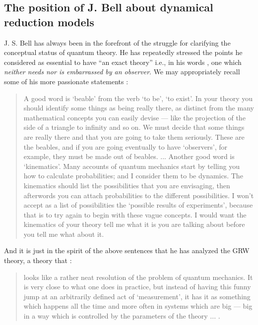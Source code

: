 \documentclass[12pt]{article}
\begin{document}
\subsection{The position of J. Bell about dynamical reduction
models} \label{sec121}

J. S. Bell has always been in the forefront of the struggle for
clarifying the conceptual status of quantum theory. He has
repeatedly stressed the points he considered as essential to have
``an exact theory'' i.e., in his words \cite{bellqg}, one which
{\it neither needs nor is embarrassed by an observer}. We may
appropriately recall some of his more passionate statements \cite{bell89}:
\begin{quotation}
A good word is `beable' from the verb `to be', `to exist'. In your
theory you should identify some things as being really there, as
distinct from the many mathematical concepts you can easily devise
--- like the projection of the side of a triangle to infinity and
so on. We must decide that some things are really there and that
you are going to take them seriously. These are the beables, and
if you are going eventually to have `observers', for example, they
must be made out of beables. ... Another good word is
`kinematics'. Many accounts of quantum mechanics start by telling
you how to calculate probabilities; and I consider them to be
dynamics. The kinematics should list the possibilities that you
are envisaging, then afterwords you can attach probabilities to
the different possibilities. I won't accept as a list of
possibilities the `possible results of experiments', because that
is to try again to begin with these vague concepts. I would want
the kinematics of your theory tell me what it is you are talking
about before you tell me what about it.
\end{quotation}
And it is just in the spirit of the above sentences that he has
analyzed the GRW theory, a theory that \cite{bell89}:
\begin{quotation}
looks like a rather neat resolution of the problem of quantum
mechanics. It is very close to what one does in practice, but
instead of having this funny jump at an arbitrarily defined act of
`measurement', it has it as something which happens all the time
and more often in systems which are big --- big in a way which is
controlled by the parameters of the theory ... .
\end{quotation}
\end{document}

